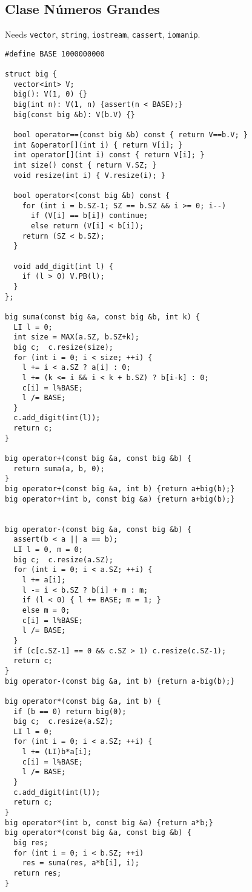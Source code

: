 \documentclass[10pt, a4, oneside]{article}
\begin{document}
\subsection{Clase Números Grandes}
Needs \verb-vector-, \verb-string-, \verb-iostream-, \verb-cassert-, \verb-iomanip-.
\begin{verbatim}
#define BASE 1000000000

struct big {
  vector<int> V;
  big(): V(1, 0) {}
  big(int n): V(1, n) {assert(n < BASE);}
  big(const big &b): V(b.V) {}

  bool operator==(const big &b) const { return V==b.V; }
  int &operator[](int i) { return V[i]; }
  int operator[](int i) const { return V[i]; }
  int size() const { return V.SZ; }
  void resize(int i) { V.resize(i); }

  bool operator<(const big &b) const {
    for (int i = b.SZ-1; SZ == b.SZ && i >= 0; i--)
      if (V[i] == b[i]) continue;
      else return (V[i] < b[i]);
    return (SZ < b.SZ);
  }

  void add_digit(int l) {
    if (l > 0) V.PB(l);
  }
};

big suma(const big &a, const big &b, int k) {
  LI l = 0;
  int size = MAX(a.SZ, b.SZ+k);
  big c;  c.resize(size);
  for (int i = 0; i < size; ++i) {
    l += i < a.SZ ? a[i] : 0;
    l += (k <= i && i < k + b.SZ) ? b[i-k] : 0;
    c[i] = l%BASE;
    l /= BASE;
  }
  c.add_digit(int(l));
  return c;
}

big operator+(const big &a, const big &b) {
  return suma(a, b, 0);
}
big operator+(const big &a, int b) {return a+big(b);}
big operator+(int b, const big &a) {return a+big(b);}


big operator-(const big &a, const big &b) {
  assert(b < a || a == b);
  LI l = 0, m = 0;
  big c;  c.resize(a.SZ);
  for (int i = 0; i < a.SZ; ++i) {
    l += a[i];
    l -= i < b.SZ ? b[i] + m : m;
    if (l < 0) { l += BASE; m = 1; }
    else m = 0;
    c[i] = l%BASE;
    l /= BASE;
  }
  if (c[c.SZ-1] == 0 && c.SZ > 1) c.resize(c.SZ-1);
  return c;
}
big operator-(const big &a, int b) {return a-big(b);}

big operator*(const big &a, int b) {
  if (b == 0) return big(0);
  big c;  c.resize(a.SZ);
  LI l = 0;
  for (int i = 0; i < a.SZ; ++i) {
    l += (LI)b*a[i];
    c[i] = l%BASE;
    l /= BASE;
  }
  c.add_digit(int(l));
  return c;
}
big operator*(int b, const big &a) {return a*b;}
big operator*(const big &a, const big &b) {
  big res;
  for (int i = 0; i < b.SZ; ++i)
    res = suma(res, a*b[i], i);
  return res;
}


\end{verbatim}
\end{document}
